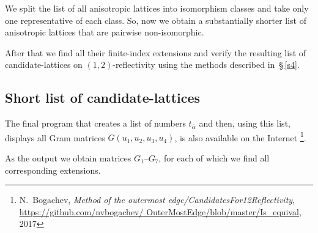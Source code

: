 \documentclass[reqno,12pt]{amsart}
\begin{document}
We split the list of all anisotropic lattices into isomorphism classes and
take only one representative of each class.  So, now we obtain
a substantially shorter list of anisotropic lattices that are pairwise non-isomorphic.


After that we find all their finite-index extensions
and verify the resulting list of candidate-lattices on $(1{,}2)$-reflectivity
using the methods described in~\S\,\ref{s4}.


\subsection{Short list of candidate-lattices}


The final program that  creates a list of numbers $t_{\overline \alpha}$ and
then, using
this list, displays all Gram matrices $G(u_1, u_2, u_3, u_4)$, is also
available on the Internet%
\footnote{N.~Bogachev, \textit{Method of the outermost edge/CandidatesFor12Reflectivity},
\href{https://github.com/nvbogachev/OuterMostEdge/blob/master/Is_equival}
{https:/\!/github.com/\allowbreak nvbogachev/\allowbreak
OuterMostEdge/blob/master/Is\_equival}, 2017}.


As the output we obtain matrices  $G_1$--$G_{7}$, for each of which we find all corresponding 
extensions. 
\end{document}
